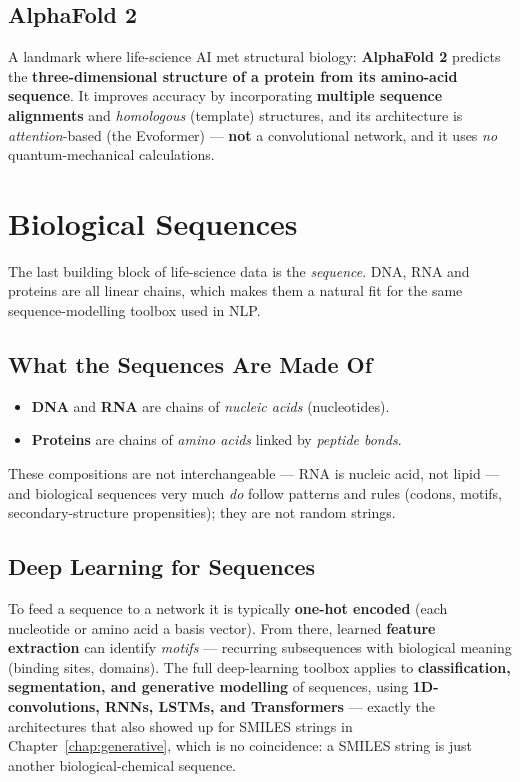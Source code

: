\documentclass[11pt, oneside]{book}
\begin{document}
\section{AlphaFold 2}

A landmark where life-science AI met structural biology: \textbf{AlphaFold 2}
predicts the \textbf{three-dimensional structure of a protein from its amino-acid
sequence}. It improves accuracy by incorporating \textbf{multiple sequence
alignments} and \emph{homologous} (template) structures, and its architecture is
\emph{attention}-based (the Evoformer) --- \textbf{not} a convolutional network, and
it uses \emph{no} quantum-mechanical calculations.


\chapter{Biological Sequences}
\label{chap:sequences}

The last building block of life-science data is the \emph{sequence}. DNA, RNA and
proteins are all linear chains, which makes them a natural fit for the same
sequence-modelling toolbox used in NLP.

\section{What the Sequences Are Made Of}

\begin{itemize}
  \item \textbf{DNA} and \textbf{RNA} are chains of \emph{nucleic acids}
        (nucleotides).
  \item \textbf{Proteins} are chains of \emph{amino acids} linked by \emph{peptide
        bonds}.
\end{itemize}

\noindent These compositions are not interchangeable --- RNA is nucleic acid, not
lipid --- and biological sequences very much \emph{do} follow patterns and rules
(codons, motifs, secondary-structure propensities); they are not random strings.

\section{Deep Learning for Sequences}

To feed a sequence to a network it is typically \textbf{one-hot encoded} (each
nucleotide or amino acid a basis vector). From there, learned \textbf{feature
extraction} can identify \emph{motifs} --- recurring subsequences with biological
meaning (binding sites, domains). The full deep-learning toolbox applies to
\textbf{classification, segmentation, and generative modelling} of sequences, using
\textbf{1D-convolutions, RNNs, LSTMs, and Transformers} --- exactly the architectures
that also showed up for SMILES strings in Chapter~\ref{chap:generative}, which is no
coincidence: a SMILES string is just another biological-chemical sequence.
\end{document}
